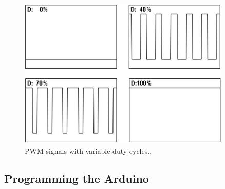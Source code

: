 \documentclass[10pt]{report}
\begin{document}
\begin{figure}[H]
\centering
   \includegraphics[width=0.9\textwidth]{dutyCycle.jpg}
    \caption{PWM signals with variable duty cycles..}
\end{figure}

\subsection*{Programming the Arduino}
\end{document}

